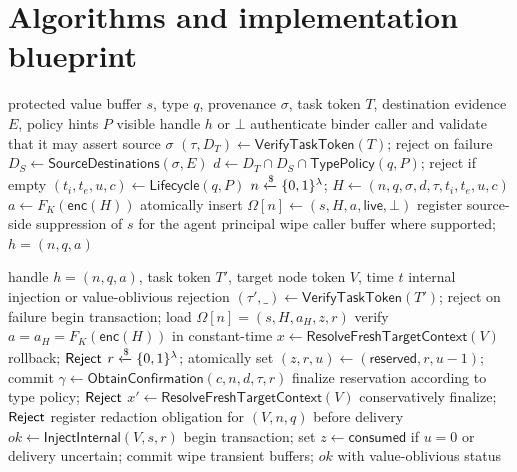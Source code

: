 \section{Algorithms and implementation blueprint}
\label{sec:algorithm}

\begin{algorithm}[htbp]
\caption{SecretHandle Mint at an authoritative source}
\label{alg:mint}
\begin{algorithmic}[1]
\Require protected value buffer $s$, type $q$, provenance $\sigma$, task token $T$, destination evidence $E$, policy hints $P$
\Ensure visible handle $h$ or $\bot$
\State authenticate binder caller and validate that it may assert source $\sigma$
\State $(\tau,D_T)\gets\mathsf{VerifyTaskToken}(T)$; reject on failure
\State $D_S\gets\mathsf{SourceDestinations}(\sigma,E)$
\State $d\gets D_T\cap D_S\cap\mathsf{TypePolicy}(q,P)$; reject if empty
\State $(t_i,t_e,u,c)\gets\mathsf{Lifecycle}(q,P)$
\State $n\xleftarrow{\$}\{0,1\}^\lambda$; $H\gets(n,q,\sigma,d,\tau,t_i,t_e,u,c)$
\State $a\gets F_K(\mathsf{enc}(H))$
\State atomically insert $\Omega[n]\gets(s,H,a,\mathsf{live},\bot)$
\State register source-side suppression of $s$ for the agent principal
\State wipe caller buffer where supported; \Return $h=(n,q,a)$
\end{algorithmic}
\end{algorithm}

\begin{algorithm}[htbp]
\caption{SecretHandle ENTER/Resolve}
\label{alg:resolve}
\begin{algorithmic}[1]
\Require handle $h=(n,q,a)$, task token $T'$, target node token $V$, time $t$
\Ensure internal injection or value-oblivious rejection
\State $(\tau',\_)\gets\mathsf{VerifyTaskToken}(T')$; reject on failure
\State begin transaction; load $\Omega[n]=(s,H,a_H,z,r)$
\State verify $a=a_H=F_K(\mathsf{enc}(H))$ in constant-time
\State $x\gets\mathsf{ResolveFreshTargetContext}(V)$
\If{$z\ne\mathsf{live}$ or $t\notin[t_i,t_e)$ or $u=0$ or $\tau'\ne\tau$ or $\Match(d,x)=0$}
  \State rollback; \Return $\mathsf{Reject}$
\EndIf
\State $r\xleftarrow{\$}\{0,1\}^\lambda$; atomically set $(z,r,u)\gets(\mathsf{reserved},r,u-1)$; commit
\State $\gamma\gets\mathsf{ObtainConfirmation}(c,n,d,\tau,r)$
  \State finalize reservation according to type policy; \Return $\mathsf{Reject}$
\EndIf
\State $x'\gets\mathsf{ResolveFreshTargetContext}(V)$
 \State conservatively finalize; \Return $\mathsf{Reject}$ \EndIf
\State register redaction obligation for $(V,n,q)$ before delivery
\State $ok\gets\mathsf{InjectInternal}(V,s,r)$
\State begin transaction; set $z\gets\mathsf{consumed}$ if $u=0$ or delivery uncertain; commit
\State wipe transient buffers; \Return $ok$ with value-oblivious status
\end{algorithmic}
\end{algorithm}

